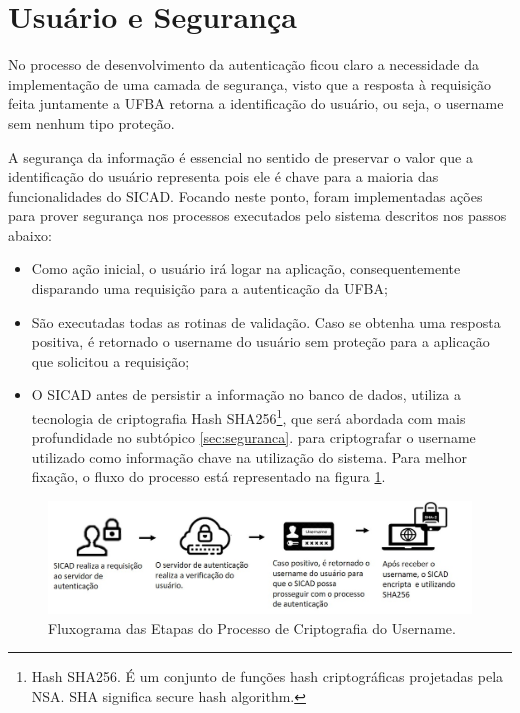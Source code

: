 \documentclass[12pt, a4paper]{report}
\begin{document}
\section{Usuário e Segurança}
\label{subsec:userseg}
No processo de desenvolvimento da autenticação ficou claro a necessidade da implementação de uma camada de segurança, visto que a resposta à requisição feita juntamente a \ac{UFBA} retorna a identificação do usuário, ou seja, o username sem nenhum tipo proteção.

A segurança da informação é essencial no sentido de preservar o valor que a identificação do usuário representa pois ele é chave para a maioria das funcionalidades do \ac{SICAD}. Focando neste ponto, foram implementadas ações para prover segurança nos processos executados pelo sistema descritos nos passos abaixo:

\begin{itemize}
\item Como ação inicial, o usuário irá logar na aplicação, consequentemente disparando uma requisição para a autenticação da \ac{UFBA};
\item São executadas todas as rotinas de validação.
Caso se obtenha uma resposta positiva, é retornado o username do usuário sem proteção para a aplicação que solicitou a requisição;
\item O \ac{SICAD} antes de persistir a informação no banco de dados, utiliza a tecnologia de criptografia Hash SHA256\footnote{Hash SHA256. É um conjunto de funções hash criptográficas projetadas pela NSA. SHA significa secure hash algorithm.}, que será abordada com mais profundidade no subtópico \ref{sec:seguranca}. para criptografar o username utilizado como informação chave na utilização do sistema. Para melhor fixação, o fluxo do processo está representado na figura \ref{fig:fluxograma_criptografia}.
\end{itemize}

\begin{figure}
\centering
\includegraphics[scale=0.80]{fluxograma_criptografia.jpg}
\caption{Fluxograma das Etapas do Processo de Criptografia do Username.}
\label{fig:fluxograma_criptografia}
\end{figure}
\end{document}

